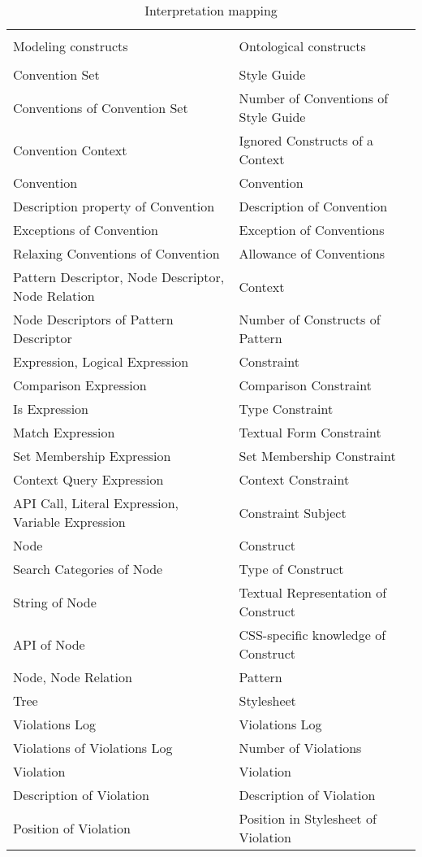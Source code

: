 \documentclass[parskip=full]{uvamscse}
\begin{document}
\begin{center}
\begin{longtable}{ | p{23em} | p{17em} | } 
\caption{Interpretation mapping}\\
\hline
 &  \\
Modeling constructs & Ontological constructs  \\
 &  \\
\hline

Convention Set & Style Guide \\ \hline
Conventions of Convention Set & Number of Conventions of Style Guide \\ \hline
Convention Context & Ignored Constructs of a Context \\ \hline
Convention & Convention \\ \hline
Description property of Convention & Description of Convention \\ \hline
Exceptions of Convention & Exception of Conventions \\ \hline
Relaxing Conventions of Convention & Allowance of Conventions \\ \hline
Pattern Descriptor, Node Descriptor, Node Relation & Context \\ \hline
Node Descriptors of Pattern Descriptor & Number of Constructs of Pattern \\ \hline
Expression, Logical Expression & Constraint \\ \hline
Comparison Expression & Comparison Constraint \\ \hline
Is Expression & Type Constraint \\ \hline
Match Expression  & Textual Form Constraint \\ \hline
Set Membership Expression & Set Membership Constraint \\ \hline
Context Query Expression & Context Constraint \\ \hline
API Call, Literal Expression, Variable Expression & Constraint Subject \\ \hline
Node & Construct \\ \hline
Search Categories of Node & Type of Construct \\ \hline
String of Node & Textual Representation of Construct \\ \hline
API of Node & CSS-specific knowledge of Construct \\ \hline
Node, Node Relation & Pattern \\ \hline
Tree & Stylesheet \\ \hline
Violations Log & Violations Log \\ \hline
Violations of Violations Log & Number of Violations \\ \hline
Violation & Violation \\ \hline
Description of Violation & Description of Violation \\ \hline
Position of Violation & Position in Stylesheet of Violation \\ \hline
\end{longtable}
\end{center}
\end{document}

